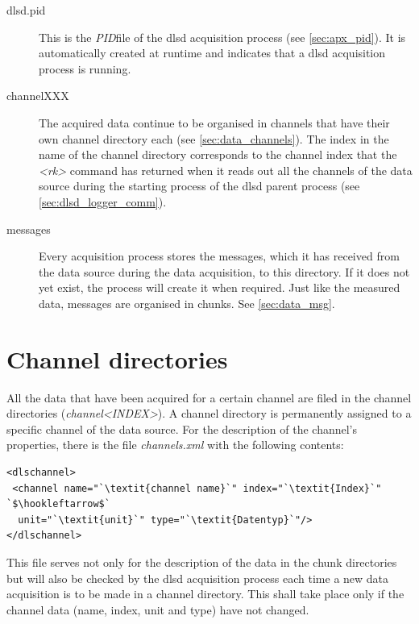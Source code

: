 \documentclass[a4paper,12pt,BCOR6mm,bibtotoc,idxtotoc]{scrbook}
\begin{document}
\begin{description}
\item[dlsd.pid] This is the \textit{PID}file of the dlsd
acquisition process (see \autoref{sec:apx_pid}). It is automatically created
at runtime and indicates that a dlsd acquisition process is running.

\item[channelXXX] The acquired data continue to be organised in channels that
have their own channel directory each (see \autoref{sec:data_channels}).  The
index in the name of the channel directory corresponds to the channel index
that the \textit{\textless rk\textgreater}  command has returned when it reads
out all the channels of the data source during the starting process of the
dlsd parent process (see \autoref{sec:dlsd_logger_comm}).

\item[messages] Every acquisition process stores the messages, which it has
received from the data source during the data acquisition, to this directory.
If it does not yet exist, the process will create it when required. Just like
the measured data, messages are organised in chunks. See
\autoref{sec:data_msg}.

\end{description}



\section{Channel directories}
\label{sec:data_channels}

All the data that have been acquired for a certain channel are filed in the channel directories (\textit{channel\textless INDEX\textgreater}). A channel directory is permanently assigned to a specific channel of the data source. For the description of the channel’s properties, there is the file \textit{channels.xml} with the following contents:

\begin{lstlisting}
<dlschannel>
 <channel name="`\textit{channel name}`" index="`\textit{Index}`" `$\hookleftarrow$`
  unit="`\textit{unit}`" type="`\textit{Datentyp}`"/>
</dlschannel>
\end{lstlisting}

This file serves not only for the description of the data in the chunk directories but will also be checked by the dlsd acquisition process each time a new data acquisition is to be made in a channel directory. This shall take place only if the channel data (name, index, unit and type) have not changed.
\end{document}
